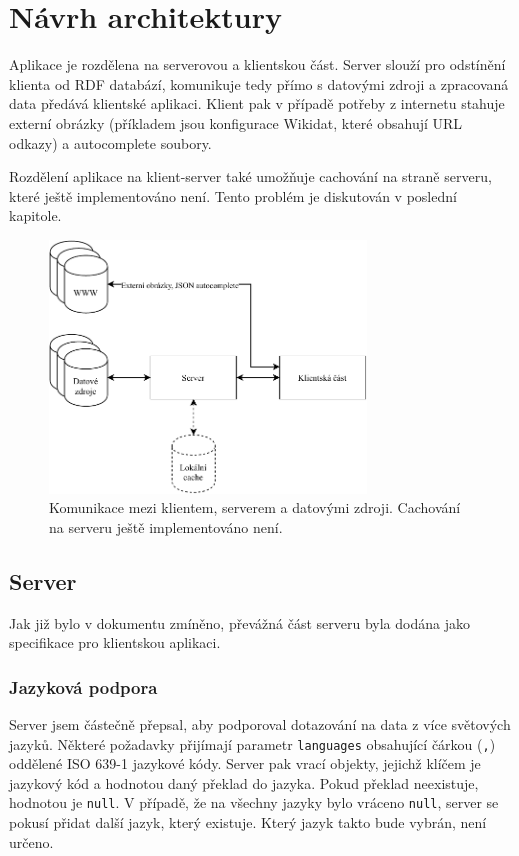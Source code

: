 \chapter{Návrh architektury}

Aplikace je rozdělena na serverovou a klientskou část. Server slouží pro odstínění klienta od RDF databází, komunikuje tedy přímo s datovými zdroji a zpracovaná data předává klientské aplikaci. Klient pak v případě potřeby z internetu stahuje externí obrázky (příkladem jsou konfigurace Wikidat, které obsahují URL odkazy) a autocomplete soubory.

Rozdělení aplikace na klient-server také umožňuje cachování na straně serveru, které ještě implementováno není. Tento problém je diskutován v poslední kapitole.

\begin{figure}[h]
    \centering
    \includegraphics[width=0.75\textwidth]{media/communication.pdf}
    \caption{Komunikace mezi klientem, serverem a datovými zdroji. Cachování na serveru ještě implementováno není.}
\end{figure}

\section{Server}
Jak již bylo v dokumentu zmíněno, převážná část serveru byla dodána jako specifikace pro klientskou aplikaci.

\subsection{Jazyková podpora} \label{jazykova-podpora}
Server jsem částečně přepsal, aby podporoval dotazování na data z více světových jazyků. Některé požadavky přijímají parametr \texttt{languages} obsahující čárkou (\texttt{,}) oddělené ISO 639-1 jazykové kódy. Server pak vrací objekty, jejichž klíčem je jazykový kód a hodnotou daný překlad do jazyka. Pokud překlad neexistuje, hodnotou je \texttt{null}. V případě, že na všechny jazyky bylo vráceno \texttt{null}, server se pokusí přidat další jazyk, který existuje. Který jazyk takto bude vybrán, není určeno.

